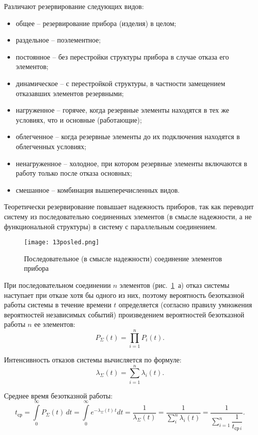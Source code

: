 \begin{enumerate}
Различают резервирование следующих видов:
\begin{itemize}
\item общее -- резервирование прибора (изделия) в целом;
\item раздельное -- поэлементное;
\item постоянное -- без перестройки структуры прибора в случае отказа его элементов;
\item динамическое -- с перестройкой структуры, в частности замещением отказавших элементов резервными;
\item нагруженное -- горячее, когда резервные элементы находятся в тех же условиях, что и основные (работающие);
\item облегченное -- когда резервные элементы до их подключения находятся в облегченных условиях;
\item ненагруженное -- холодное, при котором резервные элементы включаются в работу только после отказа основных;
\item смешанное -- комбинация вышеперечисленных видов.
\end{itemize}

Теоретически резервирование повышает надежность приборов, так как переводит систему из последовательно соединенных элементов (в смысле надежности, а не функциональной структуры) в систему с параллельным соединением.

\begin{figure}[h!]
	\caption{ Последовательное (в смысле надежности) соединение элементов прибора }
	\texttt{[image: 13posled.png]}
	\label{pic:13posled}
\end{figure}

При последовательном соединении $ n $ элементов (рис.~\ref{pic:13posled}~а) отказ системы наступает при отказе хотя бы одного из них, поэтому вероятность безотказной работы системы в течение времени $ t $ определяется (согласно правилу умножения вероятностей независимых событий) произведением вероятностей безотказной работы $ n $ ее элементов:
\[ P_\Sigma (t) = \prod\limits_{i=1}^{n}P_i(t). \]

Интенсивность отказов системы вычисляется по формуле:
\[ \lambda_\Sigma (t) = \sum\limits_{i=1}^{n}\lambda_i(t). \]

Среднее время безотказной работы:
\[ t_\text{ср} = \int\limits_{0}^{\infty} P_\Sigma (t)\,dt = \int\limits_{0}^{\infty} e^{-\lambda_\Sigma (t)\,t} dt = 
	\dfrac{1}{\lambda_\Sigma (t)} = \dfrac{1}{\sum\limits_{i}^{n} \lambda_i (t)} = \dfrac{1}{\sum\limits_{i=1}^{n}\dfrac{1}{t_{\text{ср}\,i}}}. \]


\end{enumerate}
